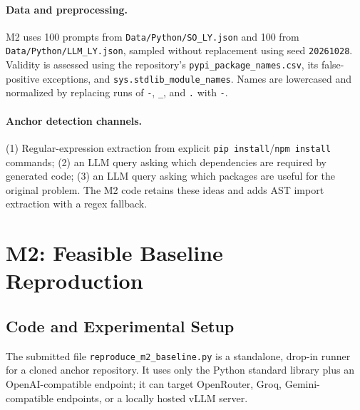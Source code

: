 \documentclass[11pt,a4paper]{article}
\begin{document}
\paragraph{Data and preprocessing.}
M2 uses 100 prompts from \texttt{Data/Python/SO\_LY.json} and 100 from \texttt{Data/Python/LLM\_LY.json}, sampled without replacement using seed \texttt{20261028}. Validity is assessed using the repository's \texttt{pypi\_package\_names.csv}, its false-positive exceptions, and \texttt{sys.stdlib\_module\_names}. Names are lowercased and normalized by replacing runs of \texttt{-}, \texttt{\_}, and \texttt{.} with \texttt{-}.

\paragraph{Anchor detection channels.}
(1) Regular-expression extraction from explicit \texttt{pip install}/\texttt{npm install} commands; (2) an LLM query asking which dependencies are required by generated code; (3) an LLM query asking which packages are useful for the original problem. The M2 code retains these ideas and adds AST import extraction with a regex fallback.

\section{M2: Feasible Baseline Reproduction}
\subsection{Code and Experimental Setup}
The submitted file \texttt{reproduce\_m2\_baseline.py} is a standalone, drop-in runner for a cloned anchor repository. It uses only the Python standard library plus an OpenAI-compatible endpoint; it can target OpenRouter, Groq, Gemini-compatible endpoints, or a locally hosted vLLM server.
\end{document}

